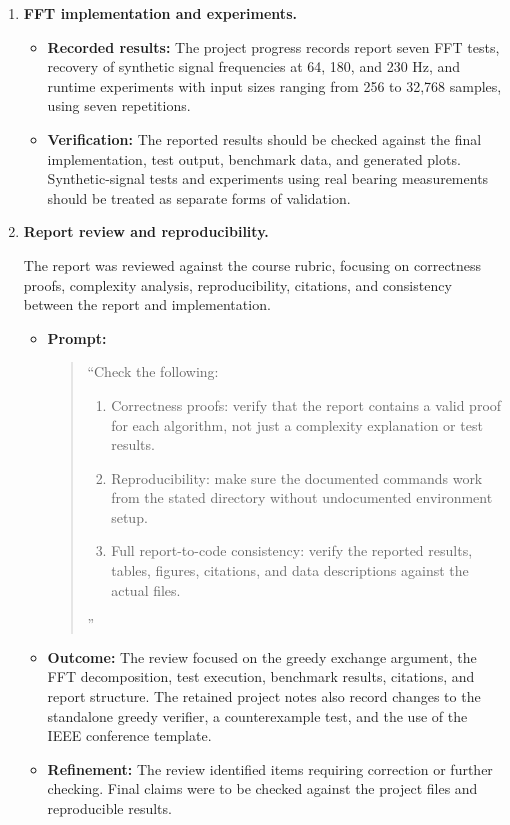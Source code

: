 \documentclass[conference]{IEEEtran}
\begin{document}
\begin{enumerate}
\item \textbf{FFT implementation and experiments.}

\begin{itemize}
    \item \textbf{Recorded results:}
    The project progress records report seven FFT tests, recovery of
    synthetic signal frequencies at 64, 180, and 230 Hz, and runtime
    experiments with input sizes ranging from 256 to 32,768 samples,
    using seven repetitions.

    \item \textbf{Verification:}
    The reported results should be checked against the final
    implementation, test output, benchmark data, and generated plots.
    Synthetic-signal tests and experiments using real bearing
    measurements should be treated as separate forms of validation.
\end{itemize}

\item \textbf{Report review and reproducibility.}

The report was reviewed against the course rubric, focusing on
correctness proofs, complexity analysis, reproducibility, citations,
and consistency between the report and implementation.

\begin{itemize}
    \item \textbf{Prompt:}
    \begin{quote}
    ``Check the following:
    \begin{enumerate}
        \item Correctness proofs: verify that the report contains a valid
        proof for each algorithm, not just a complexity explanation or
        test results.
        \item Reproducibility: make sure the documented commands work
        from the stated directory without undocumented environment setup.
        \item Full report-to-code consistency: verify the reported results,
        tables, figures, citations, and data descriptions against the
        actual files.
    \end{enumerate}''
    \end{quote}

    \item \textbf{Outcome:}
    The review focused on the greedy exchange argument, the FFT
    decomposition, test execution, benchmark results, citations, and
    report structure. The retained project notes also record changes
    to the standalone greedy verifier, a counterexample test, and the
    use of the IEEE conference template.

    \item \textbf{Refinement:}
    The review identified items requiring correction or further
    checking. Final claims were to be checked against the project
    files and reproducible results.
\end{itemize}

\end{enumerate}
\end{document}

